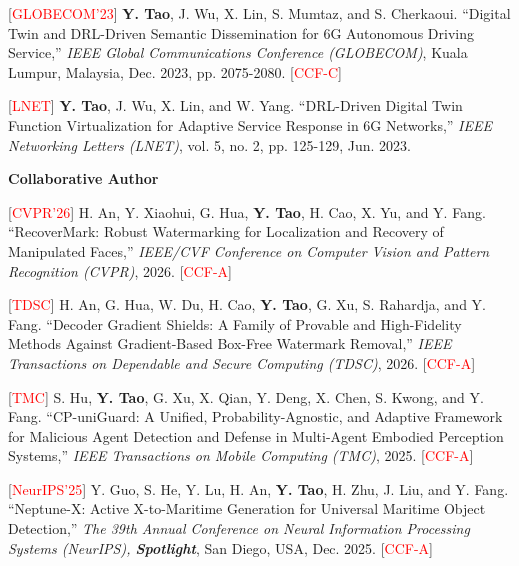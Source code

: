 \documentclass[letterpaper,11pt]{article}
\begin{document}
{{{{{{\begin{justify}
    \normalsize
    [\textcolor{red}{GLOBECOM'23}] \textbf{Y. Tao}, J. Wu, X. Lin, S. Mumtaz, and S. Cherkaoui. ``Digital Twin and DRL-Driven Semantic Dissemination for 6G Autonomous Driving Service,'' \textit{IEEE Global Communications Conference (GLOBECOM)}, Kuala Lumpur, Malaysia, Dec. 2023, pp. 2075-2080. [\textcolor{red}{CCF-C}]
\end{justify}

\begin{justify}
    \normalsize
    [\textcolor{red}{LNET}] \textbf{Y. Tao}, J. Wu, X. Lin, and W. Yang. ``DRL-Driven Digital Twin Function Virtualization for Adaptive Service Response in 6G Networks,'' \textit{IEEE Networking Letters (LNET)}, vol. 5, no. 2, pp. 125-129, Jun. 2023.
\end{justify}

\vspace{2mm}
\large\textbf{Collaborative Author}

\begin{justify}
    \normalsize
    [\textcolor{red}{CVPR'26}] H. An, Y. Xiaohui, G. Hua, \textbf{Y. Tao}, H. Cao, X. Yu, and Y. Fang. ``RecoverMark: Robust Watermarking for Localization and Recovery of Manipulated Faces,'' \textit{IEEE/CVF Conference on Computer Vision and Pattern Recognition (CVPR)}, 2026. [\textcolor{red}{CCF-A}]
\end{justify}

\begin{justify}
    \normalsize
    [\textcolor{red}{TDSC}] H. An, G. Hua, W. Du, H. Cao, \textbf{Y. Tao}, G. Xu, S. Rahardja, and Y. Fang. ``Decoder Gradient Shields: A Family of Provable and High-Fidelity Methods Against Gradient-Based Box-Free Watermark Removal,'' \textit{IEEE Transactions on Dependable and Secure Computing (TDSC)}, 2026. [\textcolor{red}{CCF-A}]
\end{justify}

\begin{justify}
    \normalsize
    [\textcolor{red}{TMC}] S. Hu, \textbf{Y. Tao}, G. Xu, X. Qian, Y. Deng, X. Chen, S. Kwong, and Y. Fang. ``CP-uniGuard: A Unified, Probability-Agnostic, and Adaptive Framework for Malicious Agent Detection and Defense in Multi-Agent Embodied Perception Systems,'' \textit{IEEE Transactions on Mobile Computing (TMC)}, 2025. [\textcolor{red}{CCF-A}]
\end{justify}

\begin{justify}
    \normalsize
    [\textcolor{red}{NeurIPS'25}] Y. Guo, S. He, Y. Lu, H. An, \textbf{Y. Tao}, H. Zhu, J. Liu, and Y. Fang. ``Neptune-X: Active X-to-Maritime Generation for Universal Maritime Object Detection,'' \textit{The 39th Annual Conference on Neural Information Processing Systems (NeurIPS), \textbf{Spotlight}}, San Diego, USA, Dec. 2025. [\textcolor{red}{CCF-A}]
\end{justify}

}}}}}}
\end{document}
